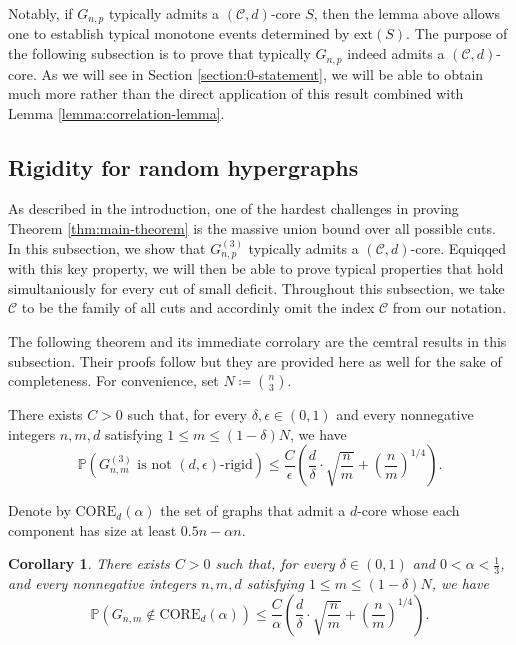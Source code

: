 \documentclass[11pt,a4paper,oneside,reqno]{amsart}
\newtheorem{cor}[thm]{Corollary}
\newcommand{\Gnp}{G_{n, p}^{(3)}}
\newcommand{\cC}{\mathcal{C}}
\renewcommand{\Pr}{\mathbb{P}}
\newcommand{\1}{\mathbbm{1}} %
\renewcommand{\le}{\leqslant}
\newcommand{\ext}{\mathrm{ext}}
\newcommand{\Core}{\mathrm{CORE}}
\begin{document}
Notably, if $G_{n, p}$ typically admits a $(\cC, d)$-core $S$, then the lemma above allows one to establish typical monotone events determined by $\ext(S)$. 
The purpose of the following subsection is to prove that typically $G_{n, p}$ indeed admits a $(\cC, d)$-core. As we will see in Section \ref{section:0-statement}, we will be able to obtain much more rather than the direct application of this result combined with Lemma \ref{lemma:correlation-lemma}.

\subsection{Rigidity for random hypergraphs}\label{section:rigidity for hypergraphs}
As described in the introduction, one of the hardest challenges in proving Theorem \ref{thm:main-theorem} is the massive union bound over all possible cuts. In this subsection, we show that $\Gnp$ typically admits a $(\cC, d)$-core. Equiqqed with this key property, we will then be able to prove typical properties that hold simultaniously for every cut of small deficit. Throughout this subsection, we take $\cC$ to be the family of all cuts and accordinly omit the index $\cC$ from our notation.

The following theorem and its immediate corrolary are the cemtral results in this subsection. Their proofs follow \cite{hoshen2023simonovits} but they are provided here as well for the sake of completeness. For convenience, set $N \coloneqq \binom{n}{3}$.
\begin{thm}\label{thm:rigidity}
    There exists $C > 0$ such that, for every $\delta, \epsilon \in (0,1)$ and every nonnegative integers $n, m, d$ satisfying $1 \le m \le (1-\delta)N$, we have
    \[
        \Pr\left(G_{n, m}^{(3)} \text{ is not } (d, \epsilon)\text{-rigid}\right) \le \frac{C}{\epsilon}\left(\frac{d}{\delta} \cdot \sqrt{\frac{n}{m}} + \left(\frac{n}{m}\right)^{1/4}\right).
    \]
\end{thm}
Denote by $\Core_d(\alpha)$ the set of graphs that admit a $d$-core whose each component has size at least $0.5n - \alpha n$.
\begin{cor}\label{cor:core}
    There exists $C > 0$ such that, for every $\delta \in (0,1)$ and $0 < \alpha < \frac{1}{3}$, and every nonnegative integers $n, m, d$ satisfying $1 \le m \le (1-\delta)N$, we have
    \[
        \Pr\left(G_{n, m} \notin \Core_{d}(\alpha)\right) \le \frac{C}{\alpha}\left(\frac{d}{\delta} \cdot \sqrt{\frac{n}{m}} + \left(\frac{n}{m}\right)^{1/4}\right).
    \]
\end{cor}
\end{document}
